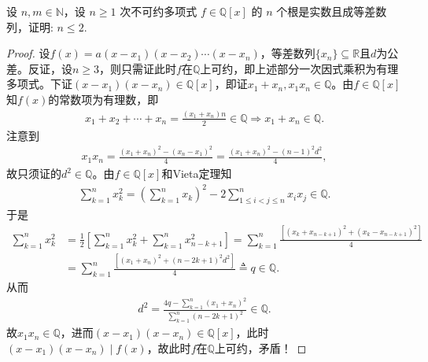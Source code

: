 \documentclass[../../main.tex]{subfiles}
\begin{document}
\begin{example}
设 \( n,m \in \mathbb{N} \)，设 \( n \geqslant 1 \) 次不可约多项式 \( f \in \mathbb{Q}[x] \) 的 \( n \) 个根是实数且成等差数列，证明: \( n \leqslant 2 \).
\end{example}
\begin{proof}
设$f(x)=a(x-x_1)(x-x_2)\cdots(x-x_n)$，等差数列$\{x_n\}\subseteq\mathbb{R}$且$d$为公差。反证，设$n\geqslant 3$，则只需证此时$f$在$\mathbb{Q}$上可约，即上述部分一次因式乘积为有理多项式。下证$(x-x_1)(x-x_n)\in\mathbb{Q}[x]$，即证$x_1+x_n,x_1x_n\in\mathbb{Q}$。由$f\in\mathbb{Q}[x]$知$f(x)$的常数项为有理数，即
\begin{align*}
x_1+x_2+\cdots+x_n=\frac{(x_1+x_n)n}{2}\in\mathbb{Q}\Longrightarrow x_1+x_n\in\mathbb{Q}.
\end{align*}
注意到
\begin{align*}
x_1x_n=\frac{(x_1+x_n)^2-(x_n-x_1)^2}{4}=\frac{(x_1+x_n)^2-(n-1)^2d^2}{4},
\end{align*}
故只须证的$d^2\in\mathbb{Q}$。由$f\in\mathbb{Q}[x]$和Vieta定理知
\begin{align*}
\sum_{k=1}^n x_k^2=\left(\sum_{k=1}^n x_k\right)^2-2\sum_{1\leqslant i<j\leqslant n}^n x_ix_j\in\mathbb{Q}.
\end{align*}
于是
\begin{align*}
\sum_{k=1}^n x_k^2&=\frac{1}{2}\left[\sum_{k=1}^n x_k^2+\sum_{k=1}^n x_{n-k+1}^2\right]=\sum_{k=1}^n \frac{\left[(x_k+x_{n-k+1})^2+(x_k-x_{n-k+1})^2\right]}{4}\\
&=\sum_{k=1}^n \frac{\left[(x_1+x_n)^2+(n-2k+1)^2d^2\right]}{4}\triangleq q\in\mathbb{Q}.
\end{align*}
从而
\begin{align*}
d^2=\frac{4q-\sum\limits_{k=1}^n (x_1+x_n)^2}{\sum\limits_{k=1}^n (n-2k+1)^2}\in\mathbb{Q}.
\end{align*}
故$x_1x_n\in\mathbb{Q}$，进而$(x-x_1)(x-x_n)\in\mathbb{Q}[x]$，此时$(x-x_1)(x-x_n)\mid f(x)$，故此时$f$在$\mathbb{Q}$上可约，矛盾！

\end{proof}
\end{document}
